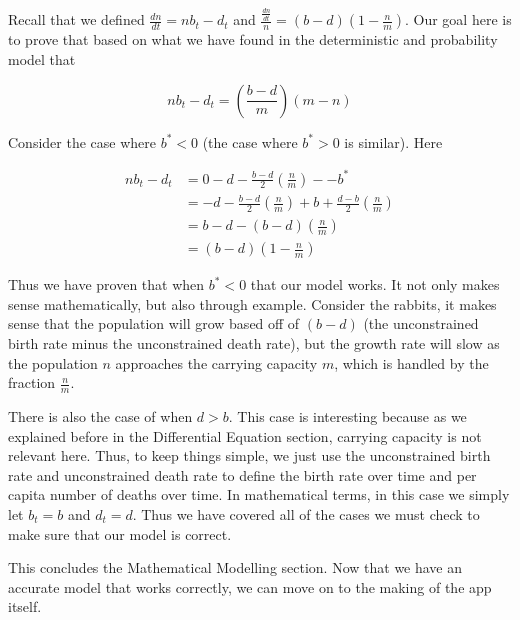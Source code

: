 \documentclass{article}\usepackage[]{graphicx}\usepackage[]{color}
\begin{document}
\noindent Recall that we defined \(\frac{dn}{dt} = nb_t-d_t\) and \(\frac{\frac{dn}{dt}}{n} = (b-d)\left(1-\frac{n}{m}\right)\). Our goal here is to prove that based on what we have found in the deterministic and probability model that 

\begin{equation}
nb_t-d_t = \left(\frac{b-d}{m}\right)(m-n)
\end{equation}

Consider the case where \(b^* < 0\) (the case where \(b^* > 0\) is similar). Here

\begin{equation}
\begin{split}
nb_t - d_t & = 0 - d - \frac{b-d}{2} \left(\frac{n}{m}\right)- -b^* \\ 
& = -d-\frac{b-d}{2} \left(\frac{n}{m}\right) +b + \frac{d-b}{2} \left(\frac{n}{m}\right) \\
& = b-d-(b-d)\left(\frac{n}{m}\right) \\
& =(b-d)\left(1-\frac{n}{m}\right)
\end{split}
\end{equation}

\noindent Thus we have proven that when \(b^* < 0\) that our model works. It not only makes sense mathematically, but also through example. Consider the rabbits, it makes sense that the population will grow based off of \((b-d)\) (the unconstrained birth rate minus the unconstrained death rate), but the growth rate will slow as the population \(n\) approaches the carrying capacity \(m\), which is handled by the fraction \(\frac{n}{m}\). 

There is also the case of when \(d>b\). This case is interesting because as we explained before in the Differential Equation section, carrying capacity is not relevant here. Thus, to keep things simple, we just use the unconstrained birth rate and unconstrained death rate to define the birth rate over time and per capita number of deaths over time. In mathematical terms, in this case we simply let \(b_t = b\) and \(d_t=d\). Thus we have covered all of the cases we must check to make sure that our model is correct. 

This concludes the Mathematical Modelling section. Now that we have an accurate model that works correctly, we can move on to the making of the app itself. 
\end{document}
